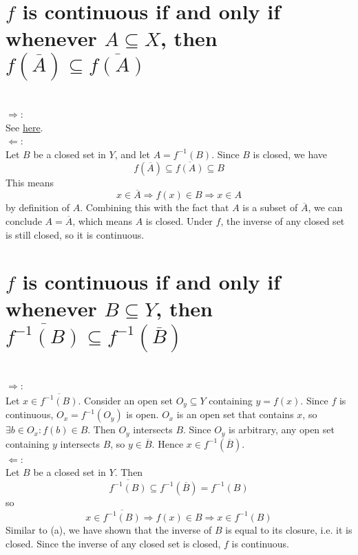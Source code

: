 \begin{parts}
 \part{$f$ is continuous if and only if whenever $A \subseteq X$, then $f(\overline{A}) \subseteq \overline{f(A)}$}
 
\begin{solution}
 \\$\Rightarrow$: \\
 See \hyperref[supp4.5.10]{here}. \\
 $\Leftarrow$: \\
 Let $B$ be a closed set in $Y$, and let $A = f^{-1}(B)$. Since $B$ is closed, we have
 $$f(\overline{A}) \subseteq \overline{f(A)} \subseteq B$$
 This means
 $$x \in \overline{A} \Rightarrow f(x) \in B \Rightarrow x \in A$$
 by definition of $A$. Combining this with the fact that $A$ is a subset of $\overline{A}$, we can conclude $A = \overline{A}$, which means $A$ is closed. Under $f$, the inverse of any closed set is still closed, so it is continuous.
\end{solution}

\part{$f$ is continuous if and only if whenever $B \subseteq Y$, then $\overline{f^{-1}(B)} \subseteq f^{-1}(\overline{B})$}

\begin{solution}
 \\$\Rightarrow$: \\
 Let $x \in \overline{f^{-1}(B)}$. Consider an open set $O_y \subseteq Y$ containing $y = f(x)$. Since $f$ is continuous, $O_x = f^{-1}(O_y)$ is open. $O_x$ is an open set that contains $x$, so $\exists b \in O_x:f(b) \in B$. Then $O_y$ intersects $B$. Since $O_y$ is arbitrary, any open set containing $y$ intersects $B$, so $y \in \overline{B}$. Hence $x \in f^{-1}(\overline{B})$. \\
 $\Leftarrow$: \\
 Let $B$ be a closed set in $Y$. Then
 $$\overline{f^{-1}(B)} \subseteq f^{-1}(\overline{B}) = f^{-1}(B)$$
 so
 $$x \in \overline{f^{-1}(B)} \Rightarrow f(x) \in B \Rightarrow x \in f^{-1}(B)$$
Similar to (a), we have shown that the inverse of $B$ is equal to its closure, i.e. it is closed. Since the inverse of any closed set is closed, $f$ is continuous.
\end{solution}
\end{parts}

